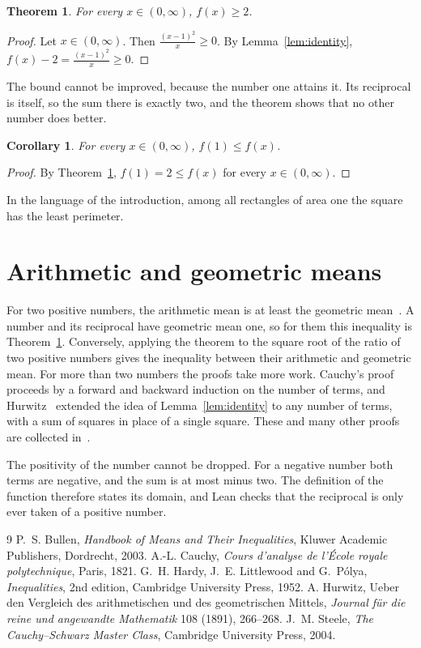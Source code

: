 \documentclass{article}
\newtheorem{theorem}[lemma]{Theorem}
\newtheorem{corollary}[lemma]{Corollary}
\begin{document}
\begin{theorem}\label{thm:bound}
For every $x\in(0,\infty)$, $f(x)\ge2$.
\end{theorem}

\begin{proof}
Let $x\in(0,\infty)$.
Then $\frac{(x-1)^2}{x}\ge0$.
By Lemma~\ref{lem:identity}, $f(x)-2=\frac{(x-1)^2}{x}\ge0$.
\end{proof}

The bound cannot be improved, because the number one attains it.
Its reciprocal is itself, so the sum there is exactly two, and the theorem shows that no other number does better.

\begin{corollary}\label{cor:min}
For every $x\in(0,\infty)$, $f(1)\le f(x)$.
\end{corollary}

\begin{proof}
By Theorem~\ref{thm:bound}, $f(1)=2\le f(x)$ for every $x\in(0,\infty)$.
\end{proof}

In the language of the introduction, among all rectangles of area one the square has the least perimeter.

\section{Arithmetic and geometric means}\label{sec:means}

For two positive numbers, the arithmetic mean is at least the geometric mean~\cite{hardy1952}.
A number and its reciprocal have geometric mean one, so for them this inequality is Theorem~\ref{thm:bound}.
Conversely, applying the theorem to the square root of the ratio of two positive numbers gives the inequality between their arithmetic and geometric mean.
For more than two numbers the proofs take more work.
Cauchy's proof proceeds by a forward and backward induction on the number of terms, and Hurwitz~\cite{hurwitz1891} extended the idea of Lemma~\ref{lem:identity} to any number of terms, with a sum of squares in place of a single square.
These and many other proofs are collected in~\cite{bullen2003,steele2004}.

The positivity of the number cannot be dropped.
For a negative number both terms are negative, and the sum is at most minus two.
The definition of the function therefore states its domain, and Lean checks that the reciprocal is only ever taken of a positive number.

\begin{thebibliography}{9}
 P.~S. Bullen, \emph{Handbook of Means and Their Inequalities}, Kluwer Academic Publishers, Dordrecht, 2003.
 A.-L. Cauchy, \emph{Cours d'analyse de l'\'Ecole royale polytechnique}, Paris, 1821.
 G.~H. Hardy, J.~E. Littlewood and G.~P\'olya, \emph{Inequalities}, 2nd edition, Cambridge University Press, 1952.
 A. Hurwitz, Ueber den Vergleich des arithmetischen und des geometrischen Mittels, \emph{Journal f\"ur die reine und angewandte Mathematik} 108 (1891), 266--268.
 J.~M. Steele, \emph{The Cauchy--Schwarz Master Class}, Cambridge University Press, 2004.
\end{thebibliography}
\end{document}
